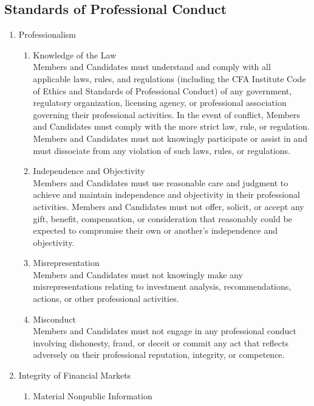 \subsection{Standards of Professional Conduct}

\begin{definition} 
\begin{enumerate}[label=\Roman*.]
\setlength{\itemsep}{0pt}
\item Professionalism
\begin{enumerate}[label=\Alph*.]
\setlength{\itemsep}{0pt}
\item Knowledge of the Law\\
Members and Candidates must understand and comply with all applicable laws, rules, and regulations (including the CFA Institute Code of Ethics and Standards of Professional Conduct) of any government, regulatory organization, licensing agency, or professional association governing their professional activities. In the event of conflict, Members and Candidates must comply with the more strict law, rule, or regulation. Members and Candidates must not knowingly participate or assist in and must dissociate from any violation of such laws, rules, or regulations.
\item Independence and Objectivity\\
Members and Candidates must use reasonable care and judgment to achieve and maintain independence and objectivity in their professional activities. Members and Candidates must not offer, solicit, or accept any gift, benefit, compensation, or consideration that reasonably could be expected to compromise their own or another’s independence and objectivity.
\item Misrepresentation\\
Members and Candidates must not knowingly make any misrepresentations relating to investment analysis, recommendations, actions, or other professional activities.
\item Misconduct\\
Members and Candidates must not engage in any professional conduct involving dishonesty, fraud, or deceit or commit any act that reflects adversely on their professional reputation, integrity, or competence.
\end{enumerate}
\item Integrity of Financial Markets
\begin{enumerate}[label=\Alph*.]
\setlength{\itemsep}{0pt}
\item Material Nonpublic Information\\

\end{enumerate}
\end{enumerate}
\end{definition}
